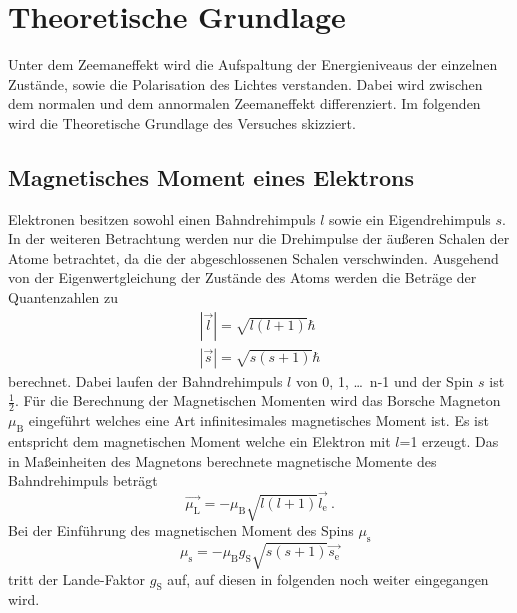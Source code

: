 \section{Theoretische Grundlage}
\label{sec:Theorie}
Unter dem Zeemaneffekt wird die Aufspaltung der Energieniveaus der einzelnen Zustände, sowie die Polarisation des Lichtes verstanden. Dabei wird zwischen dem normalen und dem annormalen Zeemaneffekt differenziert. Im folgenden wird die Theoretische Grundlage des Versuches skizziert.

\subsection{Magnetisches Moment eines Elektrons}
Elektronen besitzen sowohl einen Bahndrehimpuls $l$ sowie ein Eigendrehimpuls $s$. In der weiteren Betrachtung werden nur die Drehimpulse der äußeren Schalen der Atome betrachtet, da die der abgeschlossenen Schalen verschwinden. Ausgehend von der Eigenwertgleichung der Zustände des Atoms werden die Beträge der Quantenzahlen zu
\begin{eqnarray}
  |\vec{l}| = \sqrt{l(l+1)} \hbar  \\
  |\vec{s}| = \sqrt{s(s+1)} \hbar
  \label{eqn:betQua}
\end{eqnarray}
berechnet. Dabei laufen der Bahndrehimpuls $l$ von 0, 1, \ldots $\,$ n-1 und der Spin $s$ ist $\frac{1}{2}$. Für die Berechnung der Magnetischen Momenten wird das Borsche Magneton $\mu_\text{B}$ eingeführt welches eine Art infinitesimales magnetisches Moment ist. Es ist entspricht dem magnetischen Moment welche ein Elektron mit $l$=1 erzeugt. Das in Maßeinheiten des Magnetons berechnete magnetische Momente des Bahndrehimpuls beträgt
\begin{equation}
  \vec{\mu_\text{L}} = -\mu_\text{B} \sqrt{l(l+1)} \vec{l_\text{e}} \ .
  \label{eqn:magL}
\end{equation}
Bei der Einführung des magnetischen Moment des Spins $\mu_\text{s}$
\begin{equation}
  \mu_\text{s} = - \mu_\text{B} g_\text{S} \sqrt{s(s+1)} \vec{s_\text{e}}
  \label{eqn:magS}
\end{equation}
tritt der Lande-Faktor $g_\text{S}$ auf, auf diesen in folgenden noch weiter eingegangen wird.

